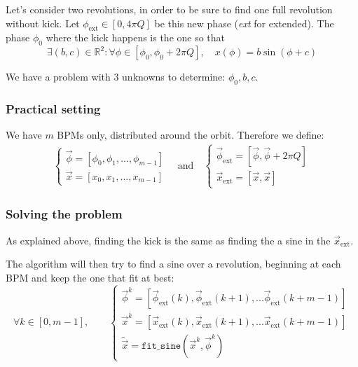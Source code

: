 Let's consider two revolutions, in order to be sure to find one full revolution without kick. Let $\phi_\mathrm{ext} \in [0, 4 \pi Q]$ be this new phase (\textit{ext} for extended). The phase $\phi_0$ where the kick happens is the one so that 
\begin{equation}
\exists (b, c) \in \mathbb{R}^2:
\forall \phi \in [\phi_0, \phi_0 + 2 \pi Q], \quad
x(\phi) = b \sin(\phi + c)
\end{equation}

We have a problem with 3 unknowns to determine: $\phi_0, b, c$. 

\subsubsection{Practical setting}

We have $m$ BPMs only, distributed around the orbit.
Therefore we define:
\begin{align}
\begin{cases}
\vec{\phi} = [\phi_0, \phi_1, ..., \phi_{m-1}] \\
\vec{x} = [x_0, x_1, ..., x_{m-1}]
\end{cases} \quad \mathrm{and} \quad
\begin{cases}
\vec{\phi}_\mathrm{ext} = [\vec{\phi}, \vec{\phi}+2\pi Q ]\\
\vec{x}_\mathrm{ext} = [\vec{x}, \vec{x}]
\end{cases}
\end{align}

\subsubsection{Solving the problem}

As explained above, finding the kick is the same as finding the a sine in the $\vec{x}_\mathrm{ext}$.

The algorithm will then try to find a sine over a revolution, beginning at each BPM and keep the one that fit at best:
\begin{equation}
\forall k \in [0, m-1], \qquad
\begin{cases}
\vec{\phi}^k = [\vec{\phi}_\mathrm{ext}(k), \vec{\phi}_\mathrm{ext}(k+1), ... \vec{\phi}_\mathrm{ext}(k+m-1)]\\
\vec{x}^k = [\vec{x}_\mathrm{ext}(k), \vec{x}_\mathrm{ext}(k+1), ... \vec{x}_\mathrm{ext}(k+m-1)]\\
\tilde{\vec{x}} = \mathtt{fit\_sine}(\vec{x}^k, \vec{\phi}^k)
\end{cases}
\end{equation}

